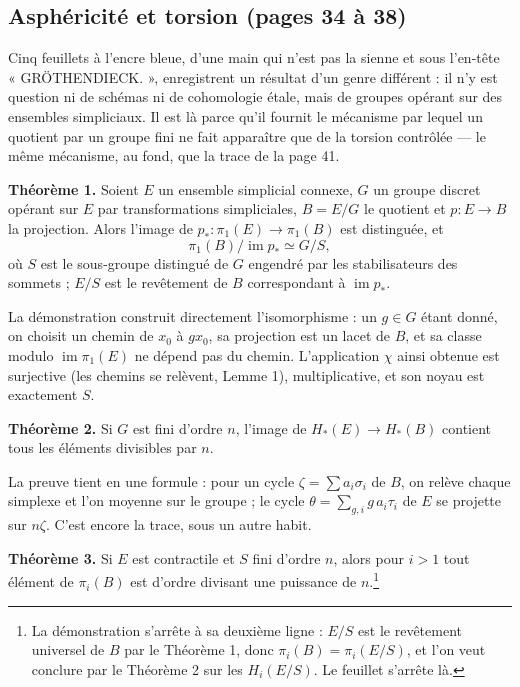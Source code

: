 \documentclass[11pt,a4paper]{article}
\begin{document}
\subsection*{Asphéricité et torsion (pages 34 à 38)}

Cinq feuillets à l'encre bleue, d'une main qui n'est pas la sienne et sous
l'en-tête « GRÖTHENDIECK. », enregistrent un résultat d'un genre différent : il
n'y est question ni de schémas ni de cohomologie étale, mais de groupes opérant
sur des ensembles simpliciaux. Il est là parce qu'il fournit le mécanisme par
lequel un quotient par un groupe fini ne fait apparaître que de la torsion
contrôlée — le même mécanisme, au fond, que la trace de la page 41.

\textbf{Théorème 1.} Soient $E$ un ensemble simplicial connexe, $G$ un groupe
discret opérant sur $E$ par transformations simpliciales, $B = E/G$ le quotient
et $p : E \to B$ la projection. Alors l'image de
$p_{*} : \pi_1(E) \to \pi_1(B)$ est distinguée, et
\[
\pi_1(B)/\operatorname{im} p_{*} \simeq G/S,
\]
où $S$ est le sous-groupe distingué de $G$ engendré par les stabilisateurs des
sommets ; $E/S$ est le revêtement de $B$ correspondant à
$\operatorname{im} p_{*}$.

La démonstration construit directement l'isomorphisme : un $g \in G$ étant
donné, on choisit un chemin de $x_0$ à $g x_0$, sa projection est un lacet de
$B$, et sa classe modulo $\operatorname{im}\pi_1(E)$ ne dépend pas du chemin.
L'application $\chi$ ainsi obtenue est surjective (les chemins se relèvent,
Lemme 1), multiplicative, et son noyau est exactement $S$.

\textbf{Théorème 2.} Si $G$ est fini d'ordre $n$, l'image de
$H_{*}(E) \to H_{*}(B)$ contient tous les éléments divisibles par $n$.

La preuve tient en une formule : pour un cycle $\zeta = \sum a_i \sigma_i$ de
$B$, on relève chaque simplexe et l'on moyenne sur le groupe ; le cycle
$\theta = \sum_{g,i} g\,a_i \tau_i$ de $E$ se projette sur $n\zeta$. C'est
encore la trace, sous un autre habit.

\textbf{Théorème 3.} Si $E$ est contractile et $S$ fini d'ordre $n$, alors pour
$i > 1$ tout élément de $\pi_i(B)$ est d'ordre divisant une puissance de
$n$.\footnote{La démonstration s'arrête à sa deuxième ligne : $E/S$ est le
revêtement universel de $B$ par le Théorème 1, donc $\pi_i(B) = \pi_i(E/S)$, et
l'on veut conclure par le Théorème 2 sur les $H_i(E/S)$. Le feuillet s'arrête
là.}

\end{document}
